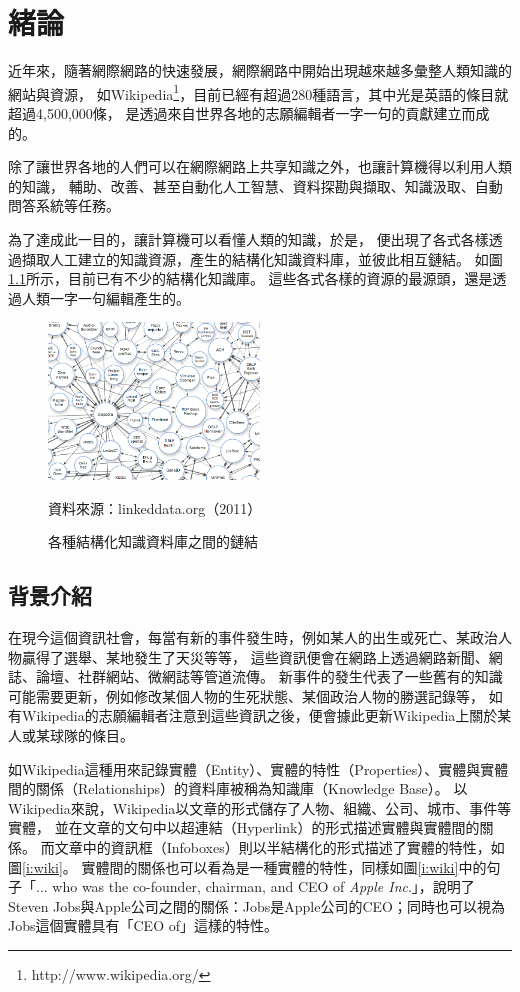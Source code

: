 %
%
%
\chapter{緒論}
\label{c:intro}

近年來，隨著網際網路的快速發展，網際網路中開始出現越來越多彙整人類知識的網站與資源，
如Wikipedia\footnote{http://www.wikipedia.org/}，目前已經有超過280種語言，其中光是英語的條目就超過4,500,000條，
是透過來自世界各地的志願編輯者一字一句的貢獻建立而成的。

除了讓世界各地的人們可以在網際網路上共享知識之外，也讓計算機得以利用人類的知識，
輔助、改善、甚至自動化人工智慧、資料探勘與擷取、知識汲取、自動問答系統等任務。

為了達成此一目的，讓計算機可以看懂人類的知識，於是，
便出現了各式各樣透過擷取人工建立的知識資源，產生的結構化知識資料庫，並彼此相互鏈結。
如圖\ref{i:lod}所示，目前已有不少的結構化知識庫。
這些各式各樣的資源的最源頭，還是透過人類一字一句編輯產生的。%

\begin{figure}
\centering
\includegraphics[width=0.5\textwidth]{images/01-lod-datasets}
\caption{各種結構化知識資料庫之間的鏈結}
\label{i:lod}
資料來源：linkeddata.org（2011）
\end{figure}

%
%
\section{背景介紹}
在現今這個資訊社會，每當有新的事件發生時，例如某人的出生或死亡、某政治人物贏得了選舉、某地發生了天災等等，
這些資訊便會在網路上透過網路新聞、網誌、論壇、社群網站、微網誌等管道流傳。
新事件的發生代表了一些舊有的知識可能需要更新，例如修改某個人物的生死狀態、某個政治人物的勝選記錄等，
如有Wikipedia的志願編輯者注意到這些資訊之後，便會據此更新Wikipedia上關於某人或某球隊的條目。

如Wikipedia這種用來記錄實體（Entity）、實體的特性（Properties）、實體與實體間的關係（Relationships）的資料庫被稱為知識庫（Knowledge Base）。
以Wikipedia來說，Wikipedia以文章的形式儲存了人物、組織、公司、城市、事件等實體，
並在文章的文句中以超連結（Hyperlink）的形式描述實體與實體間的關係。
而文章中的資訊框（Infoboxes）則以半結構化的形式描述了實體的特性，如圖\ref{i:wiki}。
實體間的關係也可以看為是一種實體的特性，同樣如圖\ref{i:wiki}中的句子「... who was the co-founder, chairman, and CEO of \emph{Apple Inc}.」，說明了Steven Jobs與Apple公司之間的關係：Jobs是Apple公司的CEO；同時也可以視為Jobs這個實體具有「CEO of」這樣的特性。

